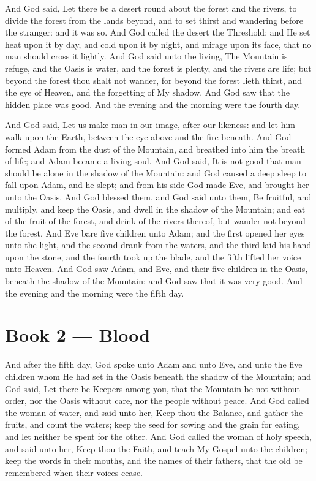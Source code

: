 And God said, Let there be a desert round about the forest and the rivers, to divide the forest from the lands beyond, and to set thirst and wandering before the stranger: and it was so. And God called the desert the Threshold; and He set heat upon it by day, and cold upon it by night, and mirage upon its face, that no man should cross it lightly. And God said unto the living, The Mountain is refuge, and the Oasis is water, and the forest is plenty, and the rivers are life; but beyond the forest thou shalt not wander, for beyond the forest lieth thirst, and the eye of Heaven, and the forgetting of My shadow. And God saw that the hidden place was good. And the evening and the morning were the fourth day.

And God said, Let us make man in our image, after our likeness: and let him walk upon the Earth, between the eye above and the fire beneath. And God formed Adam from the dust of the Mountain, and breathed into him the breath of life; and Adam became a living soul. And God said, It is not good that man should be alone in the shadow of the Mountain: and God caused a deep sleep to fall upon Adam, and he slept; and from his side God made Eve, and brought her unto the Oasis. And God blessed them, and God said unto them, Be fruitful, and multiply, and keep the Oasis, and dwell in the shadow of the Mountain; and eat of the fruit of the forest, and drink of the rivers thereof, but wander not beyond the forest. And Eve bare five children unto Adam; and the first opened her eyes unto the light, and the second drank from the waters, and the third laid his hand upon the stone, and the fourth took up the blade, and the fifth lifted her voice unto Heaven. And God saw Adam, and Eve, and their five children in the Oasis, beneath the shadow of the Mountain; and God saw that it was very good. And the evening and the morning were the fifth day.

\section*{Book 2 --- Blood}

And after the fifth day, God spoke unto Adam and unto Eve, and unto the five children whom He had set in the Oasis beneath the shadow of the Mountain; and God said, Let there be Keepers among you, that the Mountain be not without order, nor the Oasis without care, nor the people without peace. And God called the woman of water, and said unto her, Keep thou the Balance, and gather the fruits, and count the waters; keep the seed for sowing and the grain for eating, and let neither be spent for the other. And God called the woman of holy speech, and said unto her, Keep thou the Faith, and teach My Gospel unto the children; keep the words in their mouths, and the names of their fathers, that the old be remembered when their voices cease.

